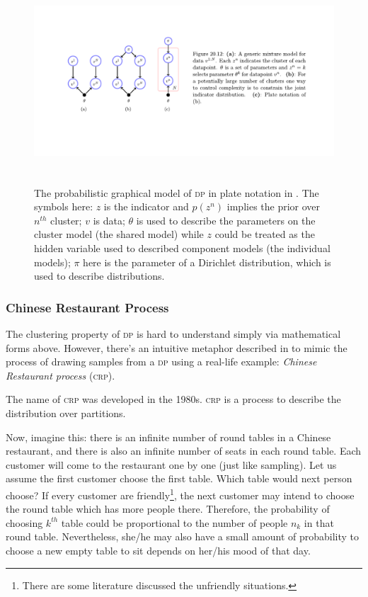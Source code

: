 \documentclass{ar-1col}
\begin{document}
\begin{figure}
    \includegraphics[width=6in, height=3in]{images/Dirichlet.pdf}
    \caption{The probabilistic graphical model of \textsc{dp} in plate notation in \citet{Barber2012}. The symbols here: $z$ is the indicator and $p(z^n)$ implies the prior over $n^{th}$ cluster; $v$ is data; $\theta$ is used to describe the parameters on the cluster model (the shared model) while $z$ could be treated as the hidden variable used to described component models (the individual models); $\pi$ here is the parameter of a Dirichlet distribution, which is used to describe distributions.}
    \label{fig:Dirichlet}
\end{figure}


\subsubsection{Chinese Restaurant Process}

The clustering property of \textsc{dp} is hard to understand simply via mathematical forms above. 
However, there's an intuitive metaphor described in \citet{Teh2006} to mimic the process of drawing samples from a \textsc{dp} using a real-life example: \textit{Chinese Restaurant process} (\textsc{crp}).

The name of \textsc{crp} was developed in the 1980s. 
\textsc{crp} is a process to describe the distribution over partitions.

Now, imagine this: there is an infinite number of round tables in a Chinese restaurant, and there is also an infinite number of seats in each round table. 
Each customer will come to the restaurant one by one (just like sampling). 
Let us assume the first customer choose the first table.
Which table would next person choose?
If every customer are friendly\footnote{There are some literature discussed the unfriendly situations.}, the next customer may intend to choose the round table which has more people there.
Therefore, the probability of choosing $k^{th}$ table could be proportional to the number of people $n_k$ in that round table.
Nevertheless, she/he may also have a small amount of probability to choose a new empty table to sit depends on her/his mood of that day.
\end{document}
